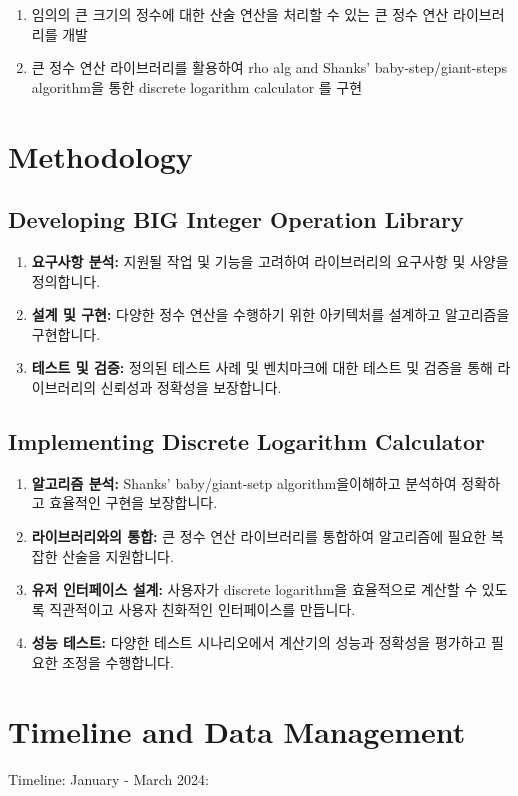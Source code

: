 \documentclass[12pt,a4paper]{article}
\begin{document}
	\begin{enumerate}
		\item 임의의 큰 크기의 정수에 대한 산술 연산을 처리할 수 있는 큰 정수 연산 라이브러리를 개발
		\item 큰 정수 연산 라이브러리를 활용하여 rho alg and Shanks' baby-step/giant-steps algorithm을 통한 discrete logarithm calculator 를 구현
	\end{enumerate}
	
	\newpage
	\section{Methodology}
	
	\subsection{Developing BIG Integer Operation Library}
	\begin{enumerate}
		\item \textbf{요구사항 분석:} 지원될 작업 및 기능을 고려하여 라이브러리의 요구사항 및 사양을 정의합니다.
		\item \textbf{설계 및 구현:} 다양한 정수 연산을 수행하기 위한 아키텍처를 설계하고 알고리즘을 구현합니다.
		\item \textbf{테스트 및 검증:} 정의된 테스트 사례 및 벤치마크에 대한 테스트 및 검증을 통해 라이브러리의 신뢰성과 정확성을 보장합니다.
	\end{enumerate}
	
	\subsection{Implementing Discrete Logarithm Calculator}
	\begin{enumerate}
		\item \textbf{알고리즘 분석:} Shanks' baby/giant-setp algorithm을이해하고 분석하여 정확하고 효율적인 구현을 보장합니다.
		\item \textbf{라이브러리와의 통합:} 큰 정수 연산 라이브러리를 통합하여 알고리즘에 필요한 복잡한 산술을 지원합니다.
		\item \textbf{유저 인터페이스 설계:} 사용자가 discrete logarithm을 효율적으로 계산할 수 있도록 직관적이고 사용자 친화적인 인터페이스를 만듭니다.
		\item \textbf{성능 테스트:} 다양한 테스트 시나리오에서 계산기의 성능과 정확성을 평가하고 필요한 조정을 수행합니다.
	\end{enumerate}
	
	\newpage
	\section{Timeline and Data Management}
	Timeline:
	January - March 2024:
	
\end{document}
